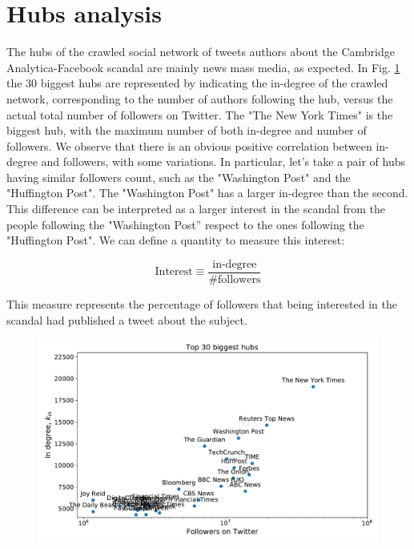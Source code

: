 \documentclass[11pt, twoside]{report}
\begin{document}
\clearpage
\section{Hubs analysis}

The hubs of the crawled social network of tweets authors about the Cambridge Analytica-Facebook scandal are mainly
news mass media, as expected. In Fig. \ref{fig:hubs_followers} the 30 biggest hubs are represented by indicating
the in-degree of the crawled network, corresponding to the number of authors following the hub, versus the actual total
number of followers on Twitter.
The "The New York Times" is the biggest hub, with the maximum number of both in-degree and number of followers.
We observe that there is an obvious positive correlation between in-degree and followers, with some variations.
In particular, let's take a pair of hubs having similar followers count, such as the "Washington Post" and the "Huffington Post".
The "Washington Post" has a larger in-degree than the second.
This difference can be interpreted as a larger interest in the scandal from the people following the "Washington Post'' respect 
to the ones following the "Huffington Post".
We can define a quantity to measure this interest:

\begin{equation}
  \text{Interest} \equiv \frac{ \text{in-degree} }{\text{\#followers}}
  \label{eq:interest}
\end{equation}

This measure represents the percentage of followers that being interested in the scandal had published a tweet about the subject.


    \begin{figure}[htbp]
      \centering
      \includegraphics[width=\textwidth]{../../scripts/network_analysis/imgs/hubs_followers.pdf}            
      \caption{}
      \label{fig:hubs_followers}
    \end{figure}
\end{document}
